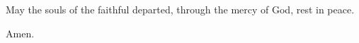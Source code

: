 
\rubric{\Vbar} May the souls of the faithful departed, through the mercy of God, rest in peace.

\rubric{\Rbar} Amen.